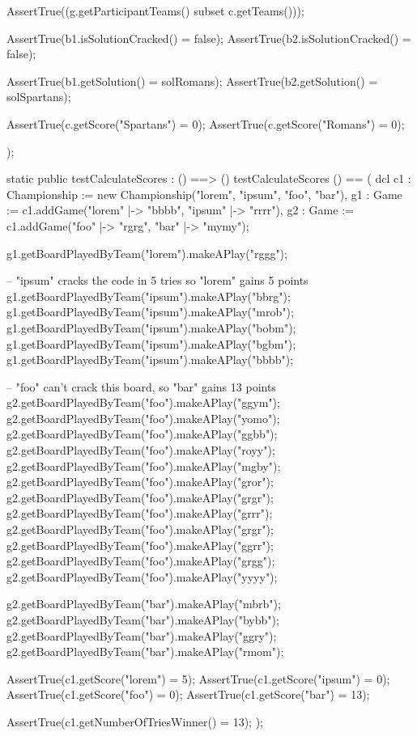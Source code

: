 \begin{vdm_al}
   AssertTrue((g.getParticipantTeams() subset c.getTeams()));

   AssertTrue(b1.isSolutionCracked() = false);
   AssertTrue(b2.isSolutionCracked() = false);

   AssertTrue(b1.getSolution() = solRomans);
   AssertTrue(b2.getSolution() = solSpartans);

   AssertTrue(c.getScore("Spartans") = 0);
   AssertTrue(c.getScore("Romans") = 0);

  );


 static public testCalculateScores : () ==> ()
 testCalculateScores () == (
   dcl c1 : Championship := new Championship({"lorem", "ipsum", "foo", "bar"}),
   g1 : Game := c1.addGame({"lorem" |-> "bbbb", "ipsum" |-> "rrrr"}),
   g2 : Game := c1.addGame({"foo" |-> "rgrg", "bar" |-> "mymy"});

   g1.getBoardPlayedByTeam("lorem").makeAPlay("rggg");

   -- "ipsum" cracks the code in 5 tries so "lorem" gains 5 points
   g1.getBoardPlayedByTeam("ipsum").makeAPlay("bbrg");
   g1.getBoardPlayedByTeam("ipsum").makeAPlay("mrob");
   g1.getBoardPlayedByTeam("ipsum").makeAPlay("bobm");
   g1.getBoardPlayedByTeam("ipsum").makeAPlay("bgbm");
   g1.getBoardPlayedByTeam("ipsum").makeAPlay("bbbb");

   -- "foo" can't crack this board, so "bar" gains 13 points
   g2.getBoardPlayedByTeam("foo").makeAPlay("ggym");
   g2.getBoardPlayedByTeam("foo").makeAPlay("yomo");
   g2.getBoardPlayedByTeam("foo").makeAPlay("ggbb");
   g2.getBoardPlayedByTeam("foo").makeAPlay("royy");
   g2.getBoardPlayedByTeam("foo").makeAPlay("mgby");
   g2.getBoardPlayedByTeam("foo").makeAPlay("gror");
   g2.getBoardPlayedByTeam("foo").makeAPlay("grgr");
   g2.getBoardPlayedByTeam("foo").makeAPlay("grrr");
   g2.getBoardPlayedByTeam("foo").makeAPlay("grgr");
   g2.getBoardPlayedByTeam("foo").makeAPlay("ggrr");
   g2.getBoardPlayedByTeam("foo").makeAPlay("grgg");
   g2.getBoardPlayedByTeam("foo").makeAPlay("yyyy");

   g2.getBoardPlayedByTeam("bar").makeAPlay("mbrb");
   g2.getBoardPlayedByTeam("bar").makeAPlay("bybb");
   g2.getBoardPlayedByTeam("bar").makeAPlay("ggry");
   g2.getBoardPlayedByTeam("bar").makeAPlay("rmom");

   AssertTrue(c1.getScore("lorem") = 5);
   AssertTrue(c1.getScore("ipsum") = 0);
   AssertTrue(c1.getScore("foo") = 0);
   AssertTrue(c1.getScore("bar") = 13);

   AssertTrue(c1.getNumberOfTriesWinner() = 13);
  );



\end{vdm_al}
